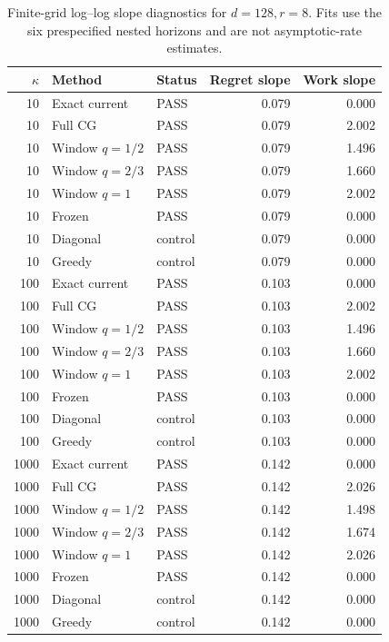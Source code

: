 \begin{table}[p]
\centering\scriptsize
\begin{tabular}{rllrr}
\toprule
$\kappa$ & Method & Status & Regret slope & Work slope \\
\midrule
10 & Exact current & PASS & 0.079 & 0.000 \\
10 & Full CG & PASS & 0.079 & 2.002 \\
10 & Window $q=1/2$ & PASS & 0.079 & 1.496 \\
10 & Window $q=2/3$ & PASS & 0.079 & 1.660 \\
10 & Window $q=1$ & PASS & 0.079 & 2.002 \\
10 & Frozen & PASS & 0.079 & 0.000 \\
10 & Diagonal & control & 0.079 & 0.000 \\
10 & Greedy & control & 0.079 & 0.000 \\
100 & Exact current & PASS & 0.103 & 0.000 \\
100 & Full CG & PASS & 0.103 & 2.002 \\
100 & Window $q=1/2$ & PASS & 0.103 & 1.496 \\
100 & Window $q=2/3$ & PASS & 0.103 & 1.660 \\
100 & Window $q=1$ & PASS & 0.103 & 2.002 \\
100 & Frozen & PASS & 0.103 & 0.000 \\
100 & Diagonal & control & 0.103 & 0.000 \\
100 & Greedy & control & 0.103 & 0.000 \\
1000 & Exact current & PASS & 0.142 & 0.000 \\
1000 & Full CG & PASS & 0.142 & 2.026 \\
1000 & Window $q=1/2$ & PASS & 0.142 & 1.498 \\
1000 & Window $q=2/3$ & PASS & 0.142 & 1.674 \\
1000 & Window $q=1$ & PASS & 0.142 & 2.026 \\
1000 & Frozen & PASS & 0.142 & 0.000 \\
1000 & Diagonal & control & 0.142 & 0.000 \\
1000 & Greedy & control & 0.142 & 0.000 \\
\bottomrule
\end{tabular}
\caption{Finite-grid log--log slope diagnostics for $d=128,r=8$.  Fits use the six prespecified nested horizons and are not asymptotic-rate estimates.}
\label{tab:certified-scaling-fits-2}
\end{table}

